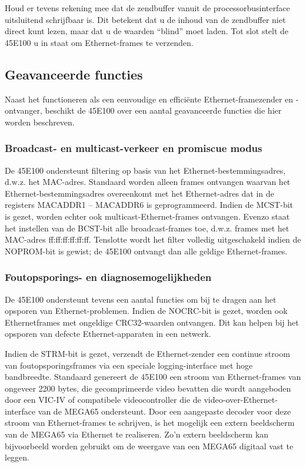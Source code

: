 Houd er tevens rekening mee dat de zendbuffer vanuit de processorbusinterface uitsluitend schrijfbaar is.  Dit betekent dat u de inhoud van de zendbuffer niet direct kunt lezen, maar dat u de waarden ``blind'' moet laden.  Tot slot stelt de 45E100 u in staat om Ethernet-frames te verzenden.

\subsection{Geavanceerde functies}

Naast het functioneren als een eenvoudige en efficiënte Ethernet-framezender en -ontvanger, beschikt de 45E100 over een aantal geavanceerde functies die hier worden beschreven.

\subsubsection{Broadcast- en multicast-verkeer en promiscue modus}

De 45E100 ondersteunt filtering op basis van het Ethernet-bestemmingsadres, d.w.z. het MAC-adres. Standaard worden alleen frames ontvangen waarvan het Ethernet-bestemmingsadres overeenkomt met het Ethernet-adres dat in de registers MACADDR1 -- MACADDR6 is geprogrammeerd. Indien de MCST-bit is gezet, worden echter ook multicast-Ethernet-frames ontvangen. Evenzo staat het instellen van de BCST-bit alle broadcast-frames toe, d.w.z. frames met het MAC-adres ff:ff:ff:ff:ff:ff. Tenslotte wordt het filter volledig uitgeschakeld indien de NOPROM-bit is gewist; de 45E100 ontvangt dan alle geldige Ethernet-frames.

\subsubsection{Foutopsporings- en diagnosemogelijkheden}

De 45E100 ondersteunt tevens een aantal functies om bij te dragen aan het opsporen van Ethernet-problemen. Indien de NOCRC-bit is gezet, worden ook Ethernetframes met ongeldige CRC32-waarden ontvangen. Dit kan helpen bij het opsporen van defecte Ethernet-apparaten in een netwerk.

Indien de STRM-bit is gezet, verzendt de Ethernet-zender een continue stroom van foutopsporingsframes via een speciale logging-interface met hoge bandbreedte. Standaard genereert de 45E100 een stroom van Ethernet-frames van ongeveer 2200 bytes, die gecomprimeerde video bevatten die wordt aangeboden door een VIC-IV of compatibele videocontroller die de video-over-Ethernet-interface van de MEGA65 ondersteunt. Door een aangepaste decoder voor deze stroom van Ethernet-frames te schrijven, is het mogelijk een extern beeldscherm van de MEGA65 via Ethernet te realiseren. Zo'n extern beeldscherm kan bijvoorbeeld worden gebruikt om de weergave van een MEGA65 digitaal vast te leggen.

